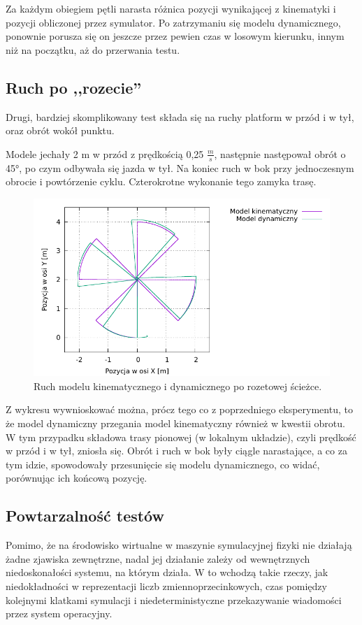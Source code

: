 		Za każdym obiegiem pętli narasta różnica pozycji wynikającej z kinematyki i pozycji obliczonej przez symulator.
		Po zatrzymaniu się modelu dynamicznego, ponownie porusza się on jeszcze przez pewien czas w losowym kierunku, innym niż na początku,
		aż do przerwania testu.
	
	\subsection{Ruch po ,,rozecie''}
		Drugi, bardziej skomplikowany test składa się na ruchy platform w przód i w tył, oraz obrót wokół punktu.
		
		Modele jechały 2 m w przód z prędkością 0,25 $\frac{m}{s}$, następnie następował obrót o 45°, po czym odbywała się jazda w tył.
		Na koniec ruch w bok przy jednoczesnym obrocie i powtórzenie cyklu. Czterokrotne wykonanie tego zamyka trasę.
		
		\begin{figure}[H]
			\centering
			\includegraphics[width=\textwidth]{plots/sun.pdf}
				\caption{Ruch modelu kinematycznego i dynamicznego po rozetowej ścieżce.}
			\label{plot:gramofon_sun}
		\end{figure}
		
		Z wykresu wywnioskować można, prócz tego co z poprzedniego eksperymentu, to że model dynamiczny przegania model kinematyczny również w kwestii obrotu.
		W tym przypadku składowa trasy pionowej (w lokalnym układzie), czyli prędkość w przód i w tył, zniosła się.
		Obrót i ruch w bok były ciągle narastające, a co za tym idzie, spowodowały przesunięcie się modelu dynamicznego, co widać, porównując ich końcową pozycję.
		
	\subsection{Powtarzalność testów}
		Pomimo, że na środowisko wirtualne w maszynie symulacyjnej fizyki nie działają żadne zjawiska zewnętrzne, nadal jej działanie zależy od wewnętrznych niedoskonałości
		systemu, na którym działa. W to wchodzą takie rzeczy, jak niedokładności w reprezentacji liczb zmiennoprzecinkowych, czas pomiędzy kolejnymi klatkami symulacji i 
		niedeterministyczne przekazywanie wiadomości przez system operacyjny.
		
